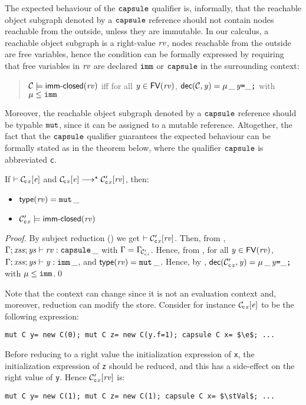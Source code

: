 {The expected behaviour of the $\texttt{capsule}$ qualifier is, informally,  that the reachable object subgraph denoted by a $\texttt{capsule}$ reference should not contain nodes reachable from the outside, unless they are immutable.
In our calculus, a reachable object subgraph is a right-value $\mathit{rv}$, nodes reachable from the outside are free variables,  hence the condition can be formally expressed by requiring that free variables in $\mathit{rv}$ are declared $\texttt{imm}$ or $\texttt{capsule}$ in the surrounding context:
\begin{quote}
${\cal{C}}\models\textsf{imm-closed}(\mathit{rv})$ iff for all $\mathit{y}\in\textsf{FV}(\mathit{rv})$, $\textsf{dec}({\cal{C}},\mathit{y})=\mu\,\_\,\mathit{y}\texttt{=}\_\texttt{;}$ with ${\mu}\leq\texttt{imm}$
\end{quote}
Moreover, the reachable object subgraph denoted by a $\texttt{capsule}$ reference should be typable $\texttt{mut}$, since it can be assigned to a mutable reference.
Altogether, the fact that the $\texttt{capsule}$ qualifier guarantees the expected behaviour can be formally stated as in the theorem below, where the qualifier $\texttt{capsule}$ is abbreviated \lstinline{c}.
\begin{theorem}[Capsule]\label{theo:capsule}
If $\vdash {\cal C}\!_{{\tt c}\hspace{.015cm}\mathit{x}}[\mathit{e}]$ and ${\cal C}\!_{{\tt c}\hspace{.015cm}\mathit{x}}[\mathit{e}]\longrightarrow^\star{\cal C}'_{{\tt c}\hspace{.015cm}\mathit{x}}[\mathit{rv}]$, then:
\begin{itemize}
\item {$\textsf{type}(\mathit{rv})=\texttt{mut}\,\_$}
\item ${\cal C}'_{{\tt c}\hspace{.015cm}\mathit{x}}\models\textsf{imm-closed}(\mathit{rv})$
\end{itemize}
\end{theorem}
\begin{proof}
By subject reduction () we get $\vdash {\cal C}'_{{\tt c}\hspace{.015cm}\mathit{x}}[\mathit{rv}]$. 
Then, from , $\Gamma;\mathit{xss};\mathit{ys}\vdash \mathit{rv}:\texttt{capsule}\,\_$ with $\Gamma=\Gamma_{\!{\cal C}'_{{\tt c}\hspace{.015cm}\mathit{x}}}$. Hence, from , for all $\mathit{y}\in\textsf{FV}(\mathit{rv})$, $\Gamma;\mathit{xss};\mathit{ys}\vdash \mathit{y}:\texttt{imm}\,\_${, and $\textsf{type}(\mathit{rv})=\texttt{mut}\,\_$. Hence,} by ,  $\textsf{dec}({\cal C}'_{{\tt c}\hspace{.015cm}\mathit{x}},\mathit{y})=\mu\,\_\,\mathit{y}\texttt{=}\_\texttt{;}$ with $\mu\leq\texttt{imm}$.\qed
\end{proof}

Note that the context can change since it is not an evaluation context and, moreover, reduction can modify the store. Consider for instance ${\cal C}\!_{{\tt c}\hspace{.015cm}\mathit{x}}[\mathit{e}]$ to be the following expression:
\begin{lstlisting}
mut C y= new C(0); mut C z= new C(y.f=1); capsule C x= $\e$; ...
\end{lstlisting}
Before reducing to a right value the initialization expression of \lstinline{x}, the initialization expression of \lstinline{z} should be reduced, and this has a side-effect on the right value of \lstinline{y}. Hence ${\cal C}'_{{\tt c}\hspace{.015cm}\mathit{x}}[\mathit{rv}]$ is:
\begin{lstlisting}
mut C y= new C(1); mut C z= new C(1); capsule C x= $\stVal$; ...
\end{lstlisting}

}
